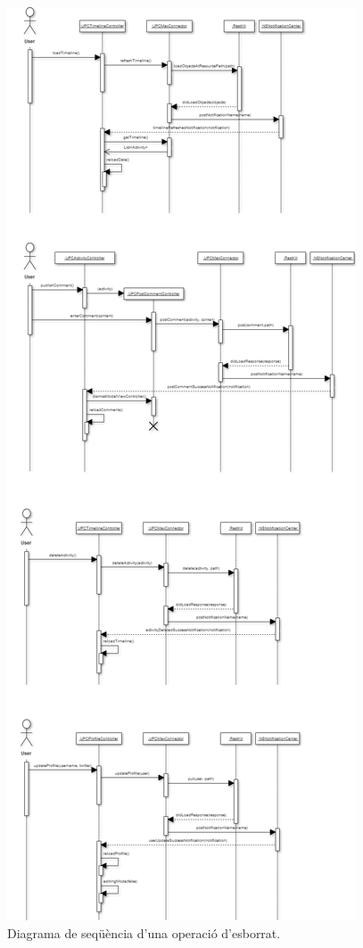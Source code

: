 \begin{figure}[ht]
    \centering
    \includegraphics*[scale=0.6, viewport=0 570 800 1120]{Memoria/Arquitectura/Projecte/Domini/model_comportament_arquitectura.png}
    \caption{Diagrama de seqüència d'una operació d'esborrat.}
    \label{fig:model_comportament_esborrar}
\end{figure}
\FloatBarrier


